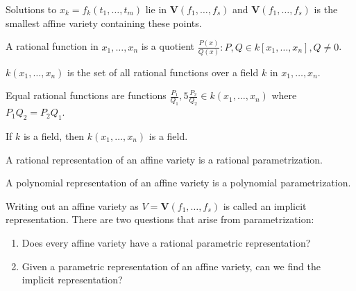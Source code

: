                 Solutions to $x_{k}=f_{k}(t_{1},\hdots,t_{m})$ lie in
                $\mathbf{V}(f_1,\hdots, f_s)$ and
                $\mathbf{V}(f_1,\hdots, f_s)$ is the smallest 
                affine variety containing these points.
                \begin{definition}
                    A rational function in $x_1,\hdots, x_n$
                    is a quotient
                    $\frac{P(x)}{Q(x)}:P,Q\in k[x_1,\hdots ,x_n],Q\ne 0$.
                \end{definition}
                \begin{definition}
                    $k(x_1,\hdots ,x_n)$ is the set of all
                    rational functions over a field $k$ in
                    $x_{1},\hdots,x_{n}$.
                \end{definition}
                \begin{definition}
                    Equal rational functions are functions
                    $\frac{P_1}{Q_1},5%
                     \frac{P_2}{Q_2}\in k(x_1,\hdots,x_n)$
                    where $P_{1}Q_{2}=P_{2}Q_{1}$.
                \end{definition}
                \begin{theorem}
                    If $k$ is a field,
                    then $k(x_1,\hdots ,x_n)$ is a field.
                \end{theorem}
                \begin{definition}
                    A rational representation of an
                    affine variety is a rational parametrization.
                \end{definition}
                \begin{definition}
                    A polynomial representation of an
                    affine variety is a polynomial parametrization.
                \end{definition}
                Writing out an affine variety as
                $V=\mathbf{V}(f_{1},\hdots,f_{s})$ is called an implicit
                representation. There are two questions that arise from
                parametrization:
                \begin{enumerate}
                    \item Does every affine variety have a
                          rational parametric representation?
                    \item Given a parametric representation of
                          an affine variety, can we find the
                          implicit representation?
                \end{enumerate}

